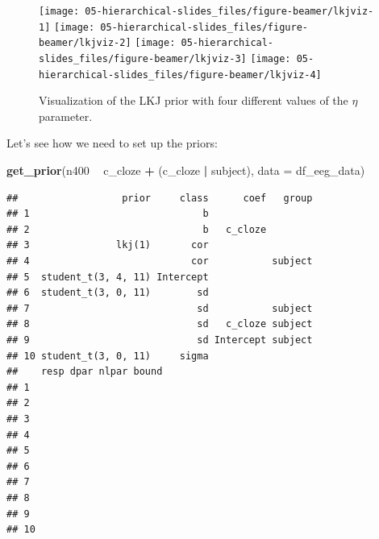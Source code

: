 \documentclass[12pt,ignorenonframetext,aspectratio=169]{beamer}
\newenvironment{Shaded}{\begin{snugshade}}{\end{snugshade}}
\newcommand{\DataTypeTok}[1]{\textcolor[rgb]{0.13,0.29,0.53}{#1}}
\newcommand{\KeywordTok}[1]{\textcolor[rgb]{0.13,0.29,0.53}{\textbf{#1}}}
\newcommand{\NormalTok}[1]{#1}
\newcommand{\OperatorTok}[1]{\textcolor[rgb]{0.81,0.36,0.00}{\textbf{#1}}}
\newcommand{\StringTok}[1]{\textcolor[rgb]{0.31,0.60,0.02}{#1}}
\begin{document}
\begin{frame}

\vspace{.1in}



\small

\begin{figure}
\texttt{[image: 05-hierarchical-slides\_files/figure-beamer/lkjviz-1]} \texttt{[image: 05-hierarchical-slides\_files/figure-beamer/lkjviz-2]} \texttt{[image: 05-hierarchical-slides\_files/figure-beamer/lkjviz-3]} \texttt{[image: 05-hierarchical-slides\_files/figure-beamer/lkjviz-4]} \caption{Visualization of the LKJ prior with four different values of the \(\eta\) parameter.}\label{fig:lkjviz}
\end{figure}

\normalsize

\end{frame}

\begin{frame}[fragile]

Let's see how we need to set up the priors:

\scriptsize

\begin{Shaded}
\begin{Highlighting}[]
\KeywordTok{get_prior}\NormalTok{(n400 }\OperatorTok{~}\StringTok{ }\NormalTok{c_cloze }\OperatorTok{+}\StringTok{ }\NormalTok{(c_cloze }\OperatorTok{|}\StringTok{ }\NormalTok{subject), }\DataTypeTok{data =}\NormalTok{ df_eeg_data)}
\end{Highlighting}
\end{Shaded}

\begin{verbatim}
##                  prior     class      coef   group
## 1                              b                  
## 2                              b   c_cloze        
## 3               lkj(1)       cor                  
## 4                            cor           subject
## 5  student_t(3, 4, 11) Intercept                  
## 6  student_t(3, 0, 11)        sd                  
## 7                             sd           subject
## 8                             sd   c_cloze subject
## 9                             sd Intercept subject
## 10 student_t(3, 0, 11)     sigma                  
##    resp dpar nlpar bound
## 1                       
## 2                       
## 3                       
## 4                       
## 5                       
## 6                       
## 7                       
## 8                       
## 9                       
## 10
\end{verbatim}

\normalsize

\end{frame}
\end{document}
